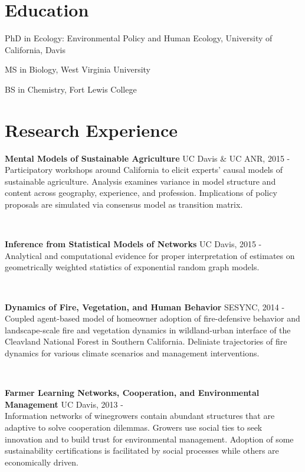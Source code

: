 \section{Education}\label{education}

\begin{description}
\tightlist
\item[2017 (anticipated)]
PhD in Ecology: Environmental Policy and Human Ecology, University of
California, Davis
\item[2012]
MS in Biology, West Virginia University
\item[2004]
BS in Chemistry, Fort Lewis College
\end{description}

\section{Research Experience}\label{research-experience}

\textbf{Mental Models of Sustainable Agriculture} UC Davis \& UC ANR,
2015 -\\
Participatory workshops around California to elicit experts' causal
models of sustainable agriculture. Analysis examines variance in model
structure and content across geography, experience, and profession.
Implications of policy proposals are simulated via consensus model as
transition matrix.

~

\textbf{Inference from Statistical Models of Networks} UC Davis, 2015
-\\
Analytical and computational evidence for proper interpretation of
estimates on geometrically weighted statistics of exponential random
graph models.

~

\textbf{Dynamics of Fire, Vegetation, and Human Behavior} SESYNC, 2014
-\\
Coupled agent-based model of homeowner adoption of fire-defensive
behavior and landscape-scale fire and vegetation dynamics in
wildland-urban interface of the Cleavland National Forest in Southern
California. Deliniate trajectories of fire dynamics for various climate
scenarios and management interventions.

~

\textbf{Farmer Learning Networks, Cooperation, and Environmental
Management} UC Davis, 2013 -\\
Information networks of winegrowers contain abundant structures that are
adaptive to solve cooperation dilemmas. Growers use social ties to seek
innovation and to build trust for environmental management. Adoption of
some sustainability certifications is facilitated by social processes
while others are economically driven.

